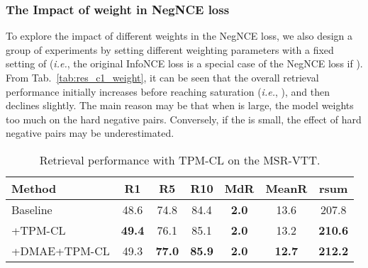 \documentclass[sigconf]{acmart}
\begin{document}
\subsubsection{The Impact of weight in NegNCE loss}
To explore the impact of different weights in the NegNCE loss, we also design a group of experiments by setting different weighting parameters  with a fixed setting of  (\emph{i.e.}, the original InfoNCE loss is a special case of the NegNCE loss if ). From Tab.~\ref{tab:res_c1_weight}, it can be seen that the overall retrieval performance initially increases before reaching saturation (\emph{i.e.}, ), and then declines slightly. The main reason may be that when  is large, the model weights too much on the hard negative pairs. Conversely, if the  is small, the effect of hard negative pairs may be underestimated. 


\begin{table}[!htb]
    \centering
    \caption{Retrieval performance with TPM-CL on the MSR-VTT.}\label{tab:res_c1c2}
    \renewcommand{\arraystretch}{0.8}\setlength\tabcolsep{2pt}\begin{tabular}{l| c c c c c c}
        \toprule
        {Method} & {R1} & {R5} & {R10} & {MdR} & {MeanR} & {rsum} \\ \toprule
        {Baseline} &48.6 &74.8	&84.4	&\textbf{2.0} &13.6	&207.8 \\ {+TPM-CL} & \textbf{49.4} &76.1 &{85.1} &\textbf{2.0}	&13.2	&\textbf{210.6} \\ {+DMAE+TPM-CL} & 49.3 &\textbf{77.0} &\textbf{85.9} &\textbf{2.0}	&\textbf{12.7}	&\textbf{212.2} \\ \bottomrule
    \end{tabular}
  \vspace{-0.2cm}
\end{table}
\end{document}
